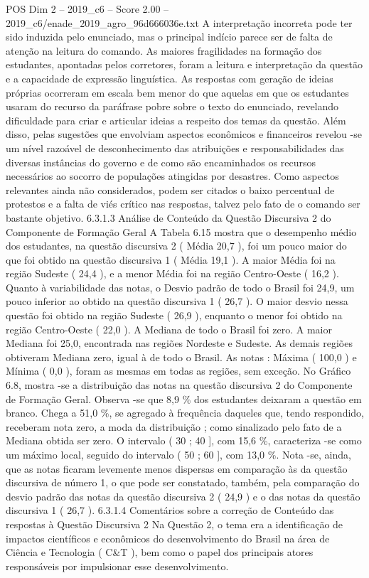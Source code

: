\begin{textsample}{POS Dim 2 – 2019\_c6 – Score 2.00 – 2019\_c6/enade\_2019\_agro\_96d666036e.txt}
A interpretação incorreta pode ter sido induzida pelo enunciado, mas o principal indício parece ser de falta de atenção na leitura do comando.
As maiores fragilidades na formação dos estudantes, apontadas pelos corretores, foram a leitura e interpretação da questão e a capacidade de expressão linguística.
As respostas com geração de ideias próprias ocorreram em escala bem menor do que aquelas em que os estudantes usaram do recurso da paráfrase pobre sobre o texto do enunciado, revelando dificuldade para criar e articular ideias a respeito dos temas da questão.
Além disso, pelas sugestões que envolviam aspectos econômicos e financeiros revelou -se um nível razoável de desconhecimento das atribuições e responsabilidades das diversas instâncias do governo e de como são encaminhados os recursos necessários ao socorro de populações atingidas por desastres.
Como aspectos relevantes ainda não considerados, podem ser citados o baixo percentual de protestos e a falta de viés crítico nas respostas, talvez pelo fato de o comando ser bastante objetivo. 6.3.1.3 Análise de Conteúdo da Questão Discursiva 2 do Componente de Formação Geral A Tabela 6.15 mostra que o desempenho médio dos estudantes, na questão discursiva 2 ( Média 20,7 ), foi um pouco maior do que foi obtido na questão discursiva 1 ( Média 19,1 ).
A maior Média foi na região Sudeste ( 24,4 ), e a menor Média foi na região Centro-Oeste ( 16,2 ).
Quanto à variabilidade das notas, o Desvio padrão de todo o Brasil foi 24,9, um pouco inferior ao obtido na questão discursiva 1 ( 26,7 ).
O maior desvio nessa questão foi obtido na região Sudeste ( 26,9 ), enquanto o menor foi obtido na região Centro-Oeste ( 22,0 ).
A Mediana de todo o Brasil foi zero.
A maior Mediana foi 25,0, encontrada nas regiões Nordeste e Sudeste.
As demais regiões obtiveram Mediana zero, igual à de todo o Brasil.
As notas : Máxima ( 100,0 ) e Mínima ( 0,0 ), foram as mesmas em todas as regiões, sem exceção.
No Gráfico 6.8, mostra -se a distribuição das notas na questão discursiva 2 do Componente de Formação Geral.
Observa -se que 8,9 \% dos estudantes deixaram a questão em branco.
Chega a 51,0 \%, se agregado à frequência daqueles que, tendo respondido, receberam nota zero, a moda da distribuição ; como sinalizado pelo fato de a Mediana obtida ser zero.
O intervalo ( 30 ; 40 ], com 15,6 \%, caracteriza -se como um máximo local, seguido do intervalo ( 50 ; 60 ], com 13,0 \%.
Nota -se, ainda, que as notas ficaram levemente menos dispersas em comparação às da questão discursiva de número 1, o que pode ser constatado, também, pela comparação do desvio padrão das notas da questão discursiva 2 ( 24,9 ) e o das notas da questão discursiva 1 ( 26,7 ). 6.3.1.4 Comentários sobre a correção de Conteúdo das respostas à Questão Discursiva 2 Na Questão 2, o tema era a identificação de impactos científicos e econômicos do desenvolvimento do Brasil na área de Ciência e Tecnologia ( C\&T ), bem como o papel dos principais atores responsáveis por impulsionar esse desenvolvimento.

\end{textsample}
